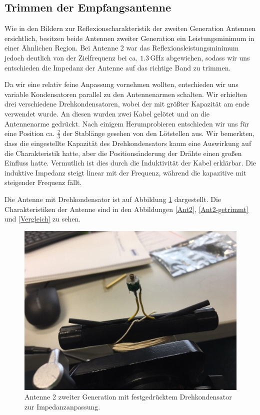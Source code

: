 \documentclass[titlepage,11pt,a4paper,ngerman]{article}
\begin{document}
\subsection{Trimmen der Empfangsantenne}

Wie in den Bildern zur Reflexionscharakteristik der zweiten Generation Antennen ersichtlich, besitzen beide Antennen zweiter Generation ein Leistungsminimum in einer Ähnlichen Region. Bei Antenne 2 war das Reflexionsleistungsminimum jedoch deutlich von der Zielfrequenz bei ca. $1.3\,$GHz abgewichen, sodass wir uns entschieden die Impedanz der Antenne auf das richtige Band zu trimmen.\par
Da wir eine relativ feine Anpassung vornehmen wollten, entschieden wir uns variable Kondensatoren parallel zu den Antennenarmen schalten. Wir erhielten drei verschiedene Drehkondensatoren, wobei der mit größter Kapazität am ende verwendet wurde. An diesen wurden zwei Kabel gelötet und an die Antennenarme gedrückt. Nach einigem Herumprobieren entschieden wir uns für eine Position ca. $\frac{2}{3}$ der Stablänge gesehen von den Lötstellen aus. Wir bemerkten, dass die eingestellte Kapazität des Drehkondensators kaum eine Auswirkung auf die Charakteristik hatte, aber die Positionsänderung der Drähte einen großen Einfluss hatte. Vermutlich ist dies durch die Induktivität der Kabel erklärbar. Die induktive Impedanz steigt linear mit der Frequenz, während die kapazitive mit steigender Frequenz fällt.\par Die Antenne mit Drehkondensator ist auf Abbildung \ref{Ant2trimm} dargestellt. Die Charakteristiken der Antenne sind in den Abbildungen \ref{Ant2}, \ref{Ant2-getrimmt} und \ref{Vergleich} zu sehen.


\begin{figure}[ht]
	\centering
	\includegraphics[scale=0.3, trim={4cm 8cm 2cm 8cm}, clip]{Bilder/Ant2trimm.jpg}
	\caption{Antenne 2 zweiter Generation mit festgedrücktem Drehkondensator zur Impedanzanpassung.}
	\label{Ant2trimm}
\end{figure}
\end{document}
